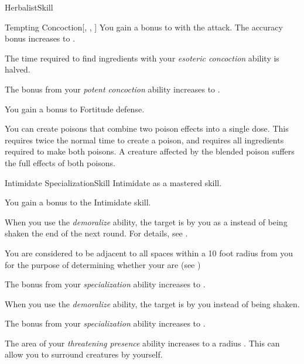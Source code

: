 \begin{feat}{Herbalist}{Skill}
\begin{attuneability}{Tempting Concoction}[, , ]
            \rankline
             You gain a  bonus to  with the attack.
             The accuracy bonus increases to .
        \end{attuneability}

         The time required to find ingredients with your \textit{esoteric concoction} ability is halved.

         The bonus from your \textit{potent concoction} ability increases to .

         You gain a  bonus to Fortitude defense.

         You can create poisons that combine two poison effects into a single dose.
        This requires twice the normal time to create a poison, and requires all ingredients required to make both poisons.
        A creature affected by the blended poison suffers the full effects of both poisons.
    \end{feat}

    \begin{feat}{Intimidate Specialization}{Skill}
        \featpre Intimidate as a mastered skill.

         You gain a  bonus to the Intimidate skill.

         When you use the \textit{demoralize} ability, the target is  by you as a  instead of being shaken the end of the next round.
        For details, see .

         You are considered to be adjacent to all spaces within a 10 foot radius  from you for the purpose of determining whether your  are  (see )

         The bonus from your \textit{specialization} ability increases to .

         When you use the \textit{demoralize} ability, the target is \frightened by you instead of being shaken.

         The bonus from your \textit{specialization} ability increases to .

         The area of your \textit{threatening presence} ability increases to a \areasmall radius .
        This can allow you to surround creatures by yourself.
    \end{feat}

